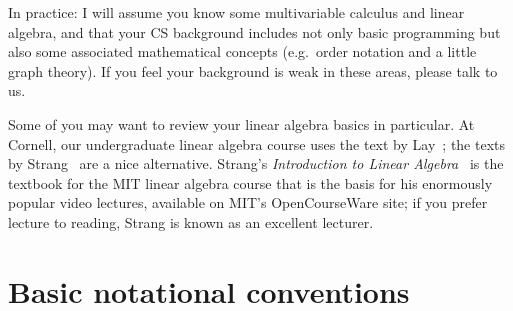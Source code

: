 \documentclass[12pt, leqno]{article}
\begin{document}
In practice: I will assume you know some multivariable calculus
and linear algebra, and that your CS background includes not only
basic programming but also some associated mathematical concepts
(e.g.~order notation and a little graph theory).  If you feel your
background is weak in these areas, please talk to us.

Some of you may want to review your linear algebra basics in particular.
At Cornell, our undergraduate linear algebra course uses the text
by Lay~\cite{Lay:2016:Linear}; the texts by Strang~\cite{Strang:2006:Linear,Strang:2009:Introduction} are a nice
alternative.  Strang's {\em Introduction to Linear Algebra}~\cite{Strang:2009:Introduction} is the textbook for the MIT
linear algebra course that is the basis for his enormously popular
video lectures, available on MIT's OpenCourseWare site; if you prefer
lecture to reading, Strang is known as an excellent lecturer.

\section{Basic notational conventions}
\end{document}
